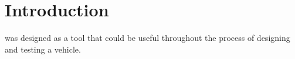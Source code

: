 \chapter{Introduction} \label{ch:introduction}

\vvase{} was designed as a tool that could be useful throughout the process of designing and testing a vehicle.

